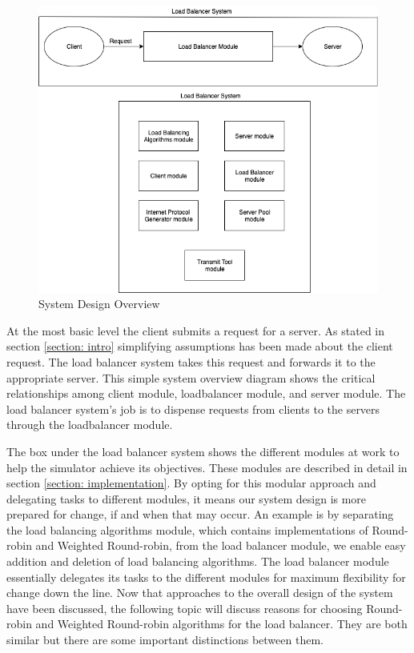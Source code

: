 \documentclass[12pt]{article}
\begin{document}
\begin{figure}[H]
    \centering
    \includegraphics[width=\linewidth]{images/System_Overview.png}
    \caption{System Design Overview }
    \label{fig:System_overview}
\end{figure}

At the most basic level the client submits a request for a server. As stated in section \ref{section: intro} simplifying assumptions has been made about the client request. The load balancer system takes this request and forwards it to the appropriate server.  This simple system overview diagram shows the critical relationships among client module, loadbalancer module, and server module. The load balancer system's job is to dispense requests from clients to the servers through the loadbalancer module.

The box under the load balancer system shows the different modules at work to help the simulator achieve its objectives. These modules are described in detail in section \ref{section: implementation}. By opting for this modular approach and delegating tasks to different modules, it means our system design is more prepared for change, if and when that may occur. An example is by separating the load balancing algorithms module, which contains implementations of Round-robin and Weighted Round-robin, from the load balancer module, we enable easy addition and deletion of load balancing algorithms. The load balancer module essentially delegates its tasks to the different modules for maximum flexibility for change down the line. Now that approaches to the overall design of the system have been discussed, the following topic will discuss reasons for choosing Round-robin and Weighted Round-robin algorithms for the load balancer. They are both similar but there are some important distinctions between them.
\end{document}
